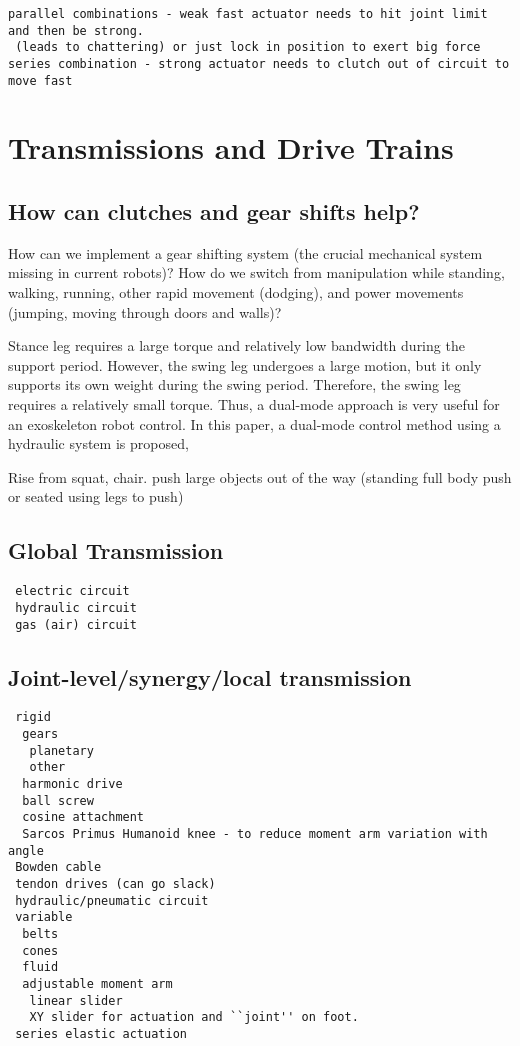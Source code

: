 \documentclass[letterpaper,12pt,fullpage]{article}
\begin{document}
\begin{verbatim}
parallel combinations - weak fast actuator needs to hit joint limit and then be strong.
 (leads to chattering) or just lock in position to exert big force
series combination - strong actuator needs to clutch out of circuit to move fast
\end{verbatim}

\section{Transmissions and Drive Trains}

\subsection{How can clutches and gear shifts help?}

How can we implement a gear shifting system (the crucial mechanical
system missing in current robots)? How do we switch from manipulation
while standing, walking, running, other rapid movement (dodging), and
power movements (jumping, moving through doors and walls)?

Stance leg requires a large torque and
relatively low bandwidth during the support period. However,
the swing leg undergoes a large motion, but it only supports
its own weight during the swing period. Therefore, the swing
leg requires a relatively small torque. Thus, a dual-mode
approach is very useful for an exoskeleton robot control.
In this paper, a dual-mode control method using a hydraulic
system is proposed,~\cite{IEEE07222598}

Rise from squat, chair.
push large objects out of the way (standing full body push
or seated using legs to push)

\subsection{Global Transmission}

\begin{verbatim}
 electric circuit
 hydraulic circuit
 gas (air) circuit
\end{verbatim}

\subsection{Joint-level/synergy/local transmission}

\begin{verbatim}
 rigid
  gears
   planetary
   other
  harmonic drive
  ball screw
  cosine attachment
  Sarcos Primus Humanoid knee - to reduce moment arm variation with angle
 Bowden cable
 tendon drives (can go slack)
 hydraulic/pneumatic circuit
 variable
  belts
  cones
  fluid
  adjustable moment arm
   linear slider
   XY slider for actuation and ``joint'' on foot.
 series elastic actuation
\end{verbatim}
\end{document}
